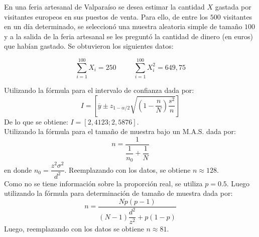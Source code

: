 
\addpoints

\question[20] En una feria artesanal de Valparaíso se desea estimar la cantidad $X$ gastada por visitantes europeos en sus puestos de venta. Para ello, de entre los $500$ visitantes en un día determinado, se seleccionó una muestra aleatoria simple de tamaño $100$ y a la salida de la feria artesanal se les preguntó la cantidad de dinero (en euros) que habían gastado. Se obtuvieron los siguientes datos:

$$\sum_{i=1}^{100} X_i =250 \hspace{30pt} \sum_{i=1}^{100} X_{i}^{2} = 649,75$$

\noaddpoints
{}
\begin{solution}
Utilizando la fórmula para el intervalo de confianza dada por:
$$I=\left[ \overline{y} \pm z_{1-\alpha/2} \sqrt{ \left( 1-\dfrac{n}{N} \right) \dfrac{s^2}{n}} \right]$$
De lo que se obtiene: $I=\left[ 2,4123 ; 2,5876 \right]$.\\

Utilizando la fórmula para el tamaño de muestra bajo un M.A.S. dada por:
$$n=\dfrac{1}{\dfrac{1}{n_0} + \dfrac{1}{N}}$$
en donde $n_0=\dfrac{z^2\sigma^2}{d^2}$. Reemplazando con los datos, se obtiene $n\approx 128$.\\
Como no se tiene información sobre la proporción real, se utiliza $p=0.5$. Luego utilizando la fórmula para determinación de tamaño de muestra dada por:
$$n=\dfrac{Np(p-1)}{(N-1)\dfrac{d^2}{z^2}+p(1-p)}$$
Luego, reemplazando con los datos se obtiene $n\approx 81$.
\end{solution}
